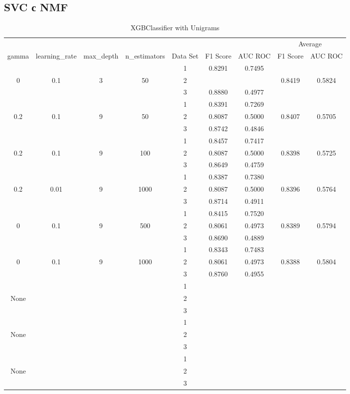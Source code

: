 \documentclass[12pt, twoside]{article}
\begin{document}
\subsection{SVC с NMF}
\begin{landscape}
\begin{table}[!htbp]
  \centering
  \begin{tabular}{ccccccccc}
  \toprule
  {}	&	{}	&	{}	&	{}	&	{}	&	{}	&	{}	&	\multicolumn{2}{c}{Average} \\
  \cmidrule(r){8-9}
  gamma	&	learning\_rate	&	max\_depth	&	n\_estimators	&	Data Set	&	F1 Score	&	AUC ROC	&	F1 Score	&	AUC ROC \\
  \midrule
  	&	&	&	&	1	&	0.8291	&	0.7495	&		&	 \\
  0	&	0.1	&	3	&	50	&	2	&		&		&	0.8419	&	0.5824 \\
  	&	&	&	&	3	&	0.8880	&	0.4977	&		&	 \\
  	\cmidrule(r){5-9}
  	&	&	&	&	1	&	0.8391	&	0.7269	&		&	 \\
  0.2	&	0.1	&	9	&	50	&	2	&	0.8087	&	0.5000	&	0.8407	&	0.5705 \\
  	&	&	&	&	3	&	0.8742	&	0.4846 	&		&	 \\
  	\cmidrule(r){5-9}
  	&	&	&	&	1	&	0.8457	&	0.7417	&		&	 \\
  0.2	&	0.1	&	9	&	100	&	2	&	0.8087	&	0.5000	&	0.8398	&	0.5725 \\
  	&	&	&	&	3	&	0.8649	&	0.4759	&		&	 \\
  	\cmidrule(r){5-9}
  	&	&	&	&	1	&	0.8387	&	0.7380	&		&	 \\
  0.2	&	0.01	&	9	&	1000	&	2	&	0.8087	&	0.5000	&	0.8396	&	0.5764 \\
  	&	&	&	&	3	&	0.8714	&	0.4911	&		&	 \\
  	\cmidrule(r){5-9}
  	&	&	&	&	1	&	0.8415	&	0.7520	&		&	 \\
  0	&	0.1	&	9	&	500	&	2	&	0.8061	&	0.4973	&	0.8389	&	0.5794 \\
  	&	&	&	&	3	&	0.8690	&	0.4889	&		&	 \\
  	\cmidrule(r){5-9}
  	&	&	&	&	1	&	0.8343	&	0.7483	&		&	 \\
  0	&	0.1	&	9	&	1000	&	2	&	0.8061	&	0.4973	&	0.8388	&	0.5804 \\
  	&	&	&	&	3	&	0.8760	&	0.4955	&		&	 \\
  	\cmidrule(r){5-9}
  	&	&	&	&	1	&		&		&		&	 \\
  None	&		&		&		&	2	&		&		&		&	 \\
  	&	&	&	&	3	&		&		&		&	 \\
  	\cmidrule(r){5-9}
  	&	&	&	&	1	&		&		&		&	 \\
  None	&		&		&		&	2	&		&		&		&	 \\
  	&	&	&	&	3	&		&		&		&	 \\
  	\cmidrule(r){5-9}
  	&	&	&	&	1	&		&		&		&	 \\
  None	&		&		&		&	2	&		&		&		&	 \\
  	&	&	&	&	3	&		&		&		&	 \\
  \bottomrule
  \end{tabular}
  \caption{XGBClassifier with Unigrams}
\end{table}
\end{landscape}
\end{document}
